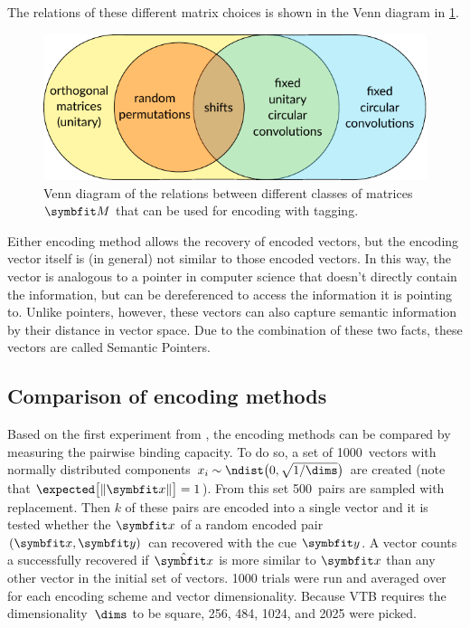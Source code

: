 The relations of these different matrix choices is shown in the Venn diagram in \cref{fig:tagging-matrices}.
\begin{figure}
    \centering
    \includegraphics[scale=0.85]{figures/tagging-matrices}
    \caption[Venn diagram of matrices for encoding with tagging.]{Venn diagram of the relations between different classes of matrices $\mat M$ that can be used for encoding with tagging.}\label{fig:tagging-matrices}
\end{figure}

Either encoding method allows the recovery of encoded vectors, but the encoding vector itself is (in general) not similar to those encoded vectors.
In this way, the vector is analogous to a pointer in computer science that doesn't directly contain the information, but can be dereferenced to access the information it is pointing to.
Unlike pointers, however, these vectors can also capture semantic information by their distance in vector space.
Due to the combination of these two facts, these vectors are called Semantic Pointers. 


\subsection{Comparison of encoding methods}
Based on the first experiment from \textcite{recchia2015}, the encoding methods can be compared by measuring the pairwise binding capacity.
To do so, a set of \num{1000}~vectors with normally distributed components $x_i \sim \ndist\!\del[1]{0, \sqrt{1/\dims}}$ are created (note that $\expected\!\sbr{\,\norm{\vc x}} = 1$).
From this set \num{500}~pairs are sampled with replacement.
Then $k$ of these pairs are encoded into a single vector and it is tested whether the $\vc x$ of a random encoded pair $(\vc x, \vc y)$ can recovered with the cue $\vc y$.
A vector counts a successfully recovered if $\hat{\vc x}$ is more similar to $\vc x$ than any other vector in the initial set of vectors.
\num{1000} trials were run and averaged over for each encoding scheme and vector dimensionality.
Because VTB requires the dimensionality~$\dims$ to be square, \num{256}, \num{484}, \num{1024}, and \num{2025} were picked.

